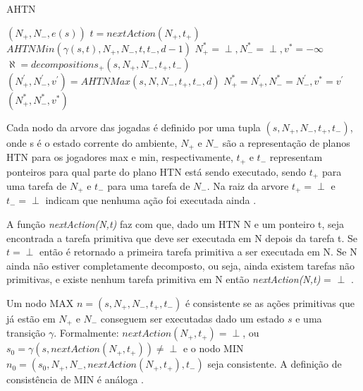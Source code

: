 \begin{algorithm}
	\caption{AHTN}
	\label{alg:ahtn}
	\begin{algorithmic}[1]		
		\State	\Return $(N_{+}, N_{-}, e(s))$
		\EndIf
		\State $t = nextAction(N_{+}, t_{+})$ 
		\State \Return $AHTNMin(\gamma(s,t), N_{+}, N_{-}, t, t_{-}, d-1)$
		\EndIf
		\State $N_{+}^{*} = \perp, N_{-}^{*} = \perp, v^{*} = -\infty$
		\State $\aleph = decompositions_{+}(s, N_{+}, N_{-}, t_{+}, t_{-})$
		\State $(N^{'}_{+}, N^{'}_{-}, v^{'}) = AHTNMax(s, N, N_{-}, t_{+}, t_{-}, d)$
		\State $N_{+}^{*} = N^{'}_{+}, N_{-}^{*} = N^{'}_{-}, v^{*} = v^{'} $
		\EndIf
		\EndFor		
		\State \Return $(N_{+}^{*}, N_{-}^{*}, v^{*} )$
		\EndFunction
	\end{algorithmic}
\end{algorithm}

Cada nodo da arvore das jogadas é definido por uma tupla $(s, N_{+}, N_{-}, t_{+}, t_{-})$, onde s é o estado corrente do ambiente, $N_{+}$ e $N_{-}$ são a representação de planos HTN para os jogadores max e min, respectivamente, $t_{+}$ e $t_{-}$ representam ponteiros para qual parte do plano HTN está sendo executado, sendo  $t_{+}$ para uma tarefa de $N_{+}$ e $t_{-}$ para uma tarefa de $N_{-}$. Na raiz da arvore $t_{+} = \perp$ e $t_{-} = \perp$ indicam que nenhuma ação foi executada ainda \cite{ontanon2015adversarial}.

A função \textit{nextAction(N,t)} faz com que, dado um HTN N e um ponteiro t, seja encontrada a tarefa primitiva que deve ser executada em N depois da tarefa t. Se $t = \perp$ então é retornado a primeira tarefa primitiva a ser executada em N. Se N ainda não estiver completamente decomposto, ou seja, ainda existem tarefas não primitivas, e existe nenhum tarefa primitiva em N então \textit{nextAction(N,t)} = $\perp$ \cite{ontanon2015adversarial}.

Um nodo MAX $n = (s, N_{+}, N_{-}, t_{+}, t_{-})$ é consistente se as ações primitivas que já estão em $N_{+}$ e $N_{-}$ conseguem ser executadas dado um estado $s$ e uma transição $\gamma$. Formalmente: $nextAction(N_{+}, t_{+}) = \perp$, ou $s_{0} = \gamma(s, nextAction(N_{+}, t_{+})) \neq \perp$ e o nodo MIN $n_{0} = (s_{0}, N_{+}, N_{-}, nextAction(N_{+}, t_{+}), t_{-})$ seja consistente. A definição de consistência de MIN é análoga \cite{ontanon2015adversarial}.

